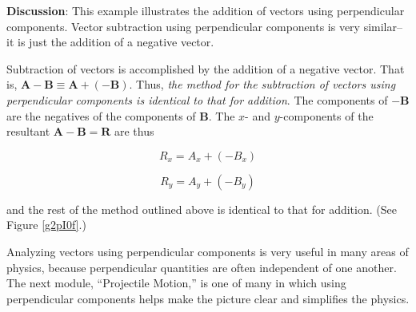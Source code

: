 \documentclass[main-ap-physics.tex]{subfiles}
\begin{document}
\begin{center}
    \captionsetup{type=figure,margin=1in,font=scriptsize}
    \label{QVly9l}
\end{center}

\textbf{Discussion}: This example illustrates the addition of vectors using perpendicular components. Vector subtraction using perpendicular components is very similar--it is just the addition of a negative vector.

\vspace{1em}

Subtraction of vectors is accomplished by the addition of a negative vector. That is, $\textbf{A}-\textbf{B} \equiv \textbf{A}+\left(-\textbf{B}\right)$. Thus, \textit{the method for the subtraction of vectors using perpendicular components is identical to that for addition}. The components of $-\textbf{B}$ are the negatives of the components of \textbf{B}. The $x$- and $y$-components of the resultant  $\textbf{A} - \textbf{B} = \textbf{R}$ are thus

\begin{equation*}
    R_x = A_x + \left(-B_x\right)
\end{equation*}

\begin{equation*}
    R_y = A_y + \left(-B_y\right)
\end{equation*}

and the rest of the method outlined above is identical to that for addition. (See Figure \ref{g2pI0f}.)

\endsolution    

Analyzing vectors using perpendicular components is very useful in many areas of physics, because perpendicular quantities are often independent of one another. The next module, ``Projectile Motion,'' is one of many in which using perpendicular components helps make the picture clear and simplifies the physics.
\end{document}
